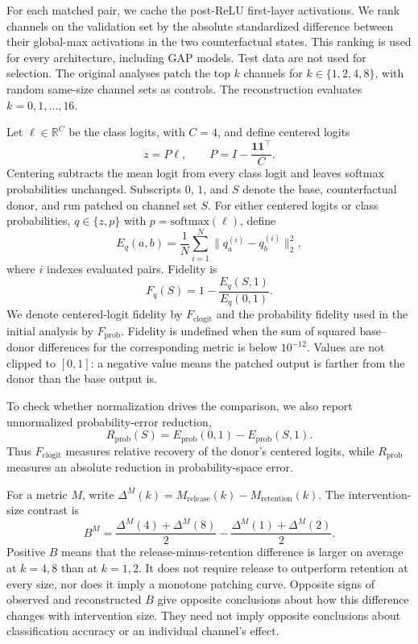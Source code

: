 \documentclass[pdflatex,sn-basic]{sn-jnl}
\begin{document}
For each matched pair, we cache the post-ReLU first-layer activations. We rank channels on the validation set by the absolute standardized difference between their global-max activations in the two counterfactual states. This ranking is used for every architecture, including GAP models. Test data are not used for selection. The original analyses patch the top $k$ channels for $k\in\{1,2,4,8\}$, with random same-size channel sets as controls. The reconstruction evaluates $k=0,1,\ldots,16$.

Let $\ell\in\mathbb R^C$ be the class logits, with $C=4$, and define centered logits
\begin{equation}
z=P\ell,\qquad P=I-\frac{\mathbf1\mathbf1^\top}{C}.
\label{eq:centered-logits}
\end{equation}
Centering subtracts the mean logit from every class logit and leaves softmax probabilities unchanged. Subscripts $0$, $1$, and $S$ denote the base, counterfactual donor, and run patched on channel set $S$. For either centered logits or class probabilities, $q\in\{z,p\}$ with $p=\mathrm{softmax}(\ell)$, define
\begin{equation}
E_q(a,b)=\frac{1}{N}\sum_{i=1}^{N}
\lVert q_a^{(i)}-q_b^{(i)}\rVert_2^2,
\label{eq:output-error}
\end{equation}
where $i$ indexes evaluated pairs. Fidelity is
\begin{equation}
F_q(S)=1-\frac{E_q(S,1)}{E_q(0,1)}.
\label{eq:fidelity}
\end{equation}
We denote centered-logit fidelity by $F_{\mathrm{clogit}}$ and the probability fidelity used in the initial analysis by $F_{\mathrm{prob}}$. Fidelity is undefined when the sum of squared base--donor differences for the corresponding metric is below $10^{-12}$. Values are not clipped to $[0,1]$: a negative value means the patched output is farther from the donor than the base output is.

To check whether normalization drives the comparison, we also report unnormalized probability-error reduction,
\begin{equation}
R_{\mathrm{prob}}(S)=E_{\mathrm{prob}}(0,1)-E_{\mathrm{prob}}(S,1).
\label{eq:prob-reduction}
\end{equation}
Thus $F_{\mathrm{clogit}}$ measures relative recovery of the donor's centered logits, while $R_{\mathrm{prob}}$ measures an absolute reduction in probability-space error.

For a metric $M$, write $\Delta^M(k)=M_{\mathrm{release}}(k)-M_{\mathrm{retention}}(k)$. The intervention-size contrast is
\begin{equation}
B^M=\frac{\Delta^M(4)+\Delta^M(8)}{2}
   -\frac{\Delta^M(1)+\Delta^M(2)}{2}.
\label{eq:B}
\end{equation}
Positive $B$ means that the release-minus-retention difference is larger on average at $k=4,8$ than at $k=1,2$. It does not require release to outperform retention at every size, nor does it imply a monotone patching curve. Opposite signs of observed and reconstructed $B$ give opposite conclusions about how this difference changes with intervention size. They need not imply opposite conclusions about classification accuracy or an individual channel's effect.
\end{document}
